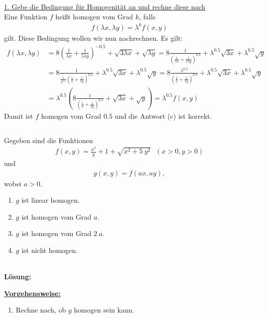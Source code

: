 \underline{1. Gebe die Bedingung für Homogenität an und rechne diese nach}\\
Eine Funktion $ f $ heißt homogen vom Grad $ k $, falls
\begin{align*}
f(\lambda x , \lambda y) = \lambda^k f(x,y)
\end{align*}
gilt. Diese Bedingung wollen wir nun nachrechnen.
Es gilt:
\begin{align*}
f(\lambda x, \lambda y)
&=
8 \left(\frac{1}{\lambda x } + \frac{1}{5 \lambda y}\right)^{-0.5} + \sqrt{3 \lambda x} + \sqrt{\lambda y}
=
8 \frac{1}{\left(\frac{1}{\lambda x } + \frac{1}{5 \lambda y}\right)^{0.5}} +  \lambda^{0.5} \sqrt{3 x} + \lambda^{0.5} \sqrt{y}\\
&=
8 \frac{1}{ \frac{1}{\lambda^{0.5}} \left(\frac{1}{ x } + \frac{1}{5  y}\right)^{0.5}} + \lambda^{0.5} \sqrt{3 x} + \lambda^{0.5} \sqrt{y}
=
8 \frac{\lambda^{0.5}}{  \left(\frac{1}{ x } + \frac{1}{5  y}\right)^{0.5}} + \lambda^{0.5} \sqrt{3 x} + \lambda^{0.5} \sqrt{y}\\
&=
 \lambda^{0.5}\left(
 8 \frac{1}{  \left(\frac{1}{ x } + \frac{1}{5  y}\right)^{0.5}} +  \sqrt{3 x} +  \sqrt{y}
 \right)
= \lambda^{0.5} f(x,y)
\end{align*}
Damit ist $ f $ homogen vom Grad $ 0.5 $ und die Antwort (c) ist korrekt.

\newpage



\subsection*{}
Gegeben sind die Funktionen
\begin{align*}
f(x,y) =  \frac{x^2}{y} + 1 + \sqrt{x^2 + 5 \ y^2} \ \ \
(x > 0 , y > 0)
\end{align*}
und
\begin{align*}
g(x,y) = f( a  x, a  y),
\end{align*}
wobei $ a >0 $.
\renewcommand{\labelenumi}{(\alph{enumi})}
\begin{enumerate}
	\item 
	$ g $ ist linear homogen.
	\item
	$ g $ ist homogen vom Grad $ a $.
	\item
	$ g $ ist homogen vom Grad $ 2 \  a $.
	\item
	$ g $ ist nicht homogen.
\end{enumerate}
\ \\
\textbf{Lösung:}
\begin{mdframed}
\underline{\textbf{Vorgehensweise:}}
\renewcommand{\labelenumi}{\theenumi.}
\begin{enumerate}
\item Rechne nach, ob $ g $ homogen sein kann.
\end{enumerate}
\end{mdframed}

